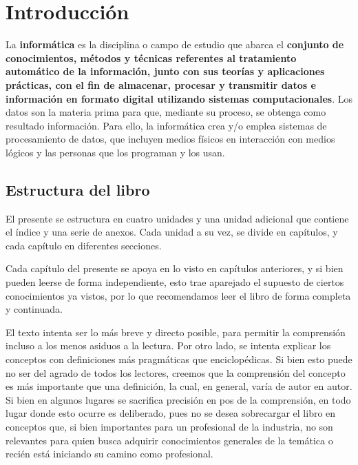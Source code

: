 
\chapter*{Introducción}
\label{intro}

La \textbf{informática} es la disciplina o campo de estudio que abarca el
\textbf{conjunto de conocimientos, métodos y técnicas referentes al tratamiento
automático de la información, junto con sus teorías y aplicaciones prácticas,
con el fin de almacenar, procesar y transmitir datos e información en formato
digital utilizando sistemas computacionales}. Los datos son la materia prima
para que, mediante su proceso, se obtenga como resultado información. Para ello,
la  informática crea y/o emplea sistemas de procesamiento de datos, que incluyen
medios físicos en interacción con medios lógicos y las personas que los
programan y los usan.

\section*{Estructura del libro}

El presente se estructura en cuatro unidades y una unidad adicional que contiene
el índice y una serie de anexos. Cada unidad a su vez, se divide en capítulos, y
cada capítulo en diferentes secciones.

Cada capítulo del presente se apoya en lo visto en capítulos anteriores, y si
bien pueden leerse de forma independiente, esto trae aparejado el supuesto de
ciertos conocimientos ya vistos, por lo que recomendamos leer el libro de forma
completa y continuada.

El texto intenta ser lo más breve y directo posible, para permitir la
comprensión incluso a los menos asiduos a la lectura. Por otro lado, se intenta
explicar los conceptos con definiciones más pragmáticas que enciclopédicas. Si
bien esto puede no ser del agrado de todos los lectores, creemos que la
comprensión del concepto es más importante que una definición, la cual, en
general, varía de autor en autor. Si bien en algunos lugares se sacrifica
precisión en pos de la comprensión, en todo lugar donde esto ocurre es
deliberado, pues no se desea sobrecargar el libro en conceptos que, si bien
importantes para un profesional de la industria, no son relevantes para quien
busca adquirir conocimientos generales de la temática o recién está iniciando su
camino como profesional.

